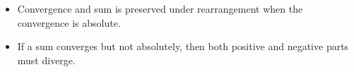 
\begin{itemize}
	\item Convergence and sum is preserved under rearrangement when the convergence is absolute.
	\item If a sum converges but not absolutely, then both positive and negative parts must diverge.
\end{itemize}
